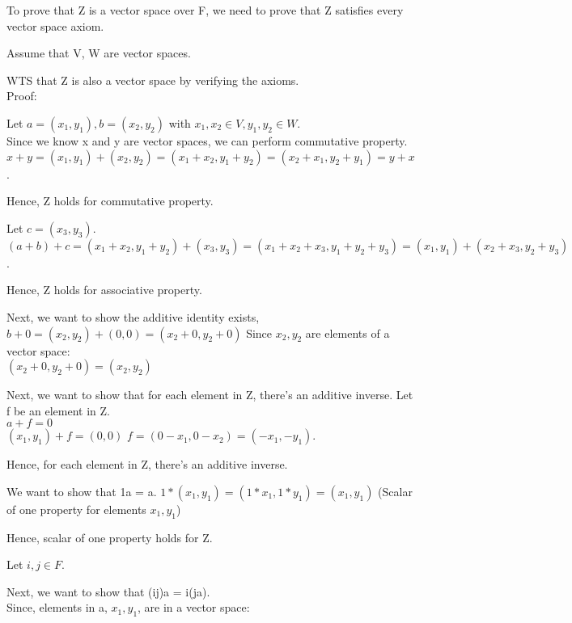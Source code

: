 \documentclass[12pt]{article}
\begin{document}
\begin{enumerate}
        To prove that Z is a vector space over F, we need to prove that Z satisfies every vector space axiom. 
        
        Assume that V, W are vector spaces. 
        
        WTS that Z is also a vector space by verifying the axioms. \\
        Proof: 
        
        Let $a = (x_1, y_1), b = (x_2, y_2)$ with $x_1, x_2 \in V, y_1, y_2 \in W$. \\
        Since we know x and y are vector spaces, we can perform commutative property. \\
        $x + y = (x_1, y_1) + (x_2, y_2) = (x_1 + x_2, y_1 + y_2) = (x_2 + x_1, y_2 + y_1) = y + x$. 

        Hence, Z holds for commutative property.

        Let $c = (x_3, y_3)$. \\
        $(a + b) + c = (x_1 + x_2, y_1 + y_2) + (x_3, y_3) = (x_1 + x_2 + x_3, y_1 + y_2 + y_3) = (x_1, y_1) + (x_2 + x_3, y_2 + y_3)$. 

        Hence, Z holds for associative property. 

        Next, we want to show the additive identity exists, \\
        $ b + 0 = (x_2, y_2) + (0, 0) = (x_2 + 0, y_2 + 0)$ 
        Since $x_2, y_2$ are elements of a vector space: \\
        $(x_2 + 0, y_2 + 0) = (x_2, y_2)$

        Next, we want to show that for each element in Z, there's an additive inverse.
        Let f be an element in Z. \\
        $a + f = 0$ \\
        $(x_1, y_1) + f = (0, 0)$
        $f = (0 - x_1, 0 - x_2) = (-x_1, -y_1)$.

        Hence, for each element in Z, there's an additive inverse. 

        We want to show that 1a = a. 
        $1 * (x_1, y_1) = (1 * x_1, 1 * y_1) = (x_1, y_1)$ (Scalar of one property for elements $x_1, y_1$)

        Hence, scalar of one property holds for Z.

        Let $i, j \in F$.

        Next, we want to show that (ij)a = i(ja). \\

        Since, elements in a, $x_1, y_1$, are in a vector space:


\end{enumerate}
\end{document}
